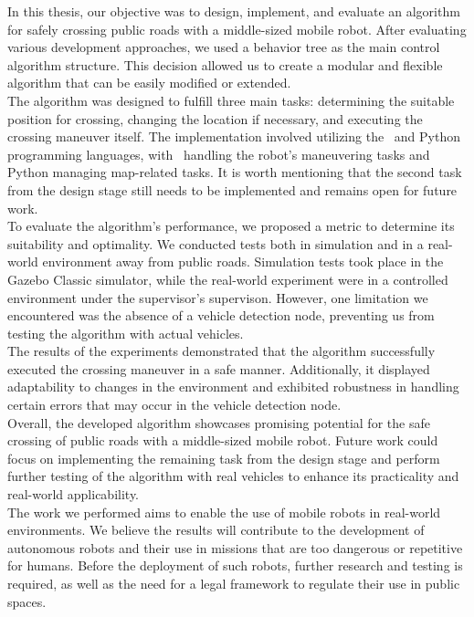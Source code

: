 In this thesis, our objective was to design, implement, and evaluate an algorithm for safely crossing public roads with a middle-sized mobile robot. After evaluating various development approaches, we used a behavior tree as the main control algorithm structure. This decision allowed us to create a modular and flexible algorithm that can be easily modified or extended.\\
The algorithm was designed to fulfill three main tasks: determining the suitable position for crossing, changing the location if necessary, and executing the crossing maneuver itself. The implementation involved utilizing the \CC\ and Python programming languages, with \CC\ handling the robot's maneuvering tasks and Python managing map-related tasks. It is worth mentioning that the second task from the design stage still needs to be implemented and remains open for future work.\\
To evaluate the algorithm's performance, we proposed a metric to determine its suitability and optimality. We conducted tests both in simulation and in a real-world environment away from public roads. Simulation tests took place in the Gazebo Classic simulator, while the real-world experiment were in a controlled environment under the supervisor's supervison. However, one limitation we encountered was the absence of a vehicle detection node, preventing us from testing the algorithm with actual vehicles.\\
The results of the experiments demonstrated that the algorithm successfully executed the crossing maneuver in a safe manner. Additionally, it displayed adaptability to changes in the environment and exhibited robustness in handling certain errors that may occur in the vehicle detection node.\\
Overall, the developed algorithm showcases promising potential for the safe crossing of public roads with a middle-sized mobile robot. Future work could focus on implementing the remaining task from the design stage and perform further testing of the algorithm with real vehicles to enhance its practicality and real-world applicability.\\
The work we performed aims to enable the use of mobile robots in real-world environments. We believe the results will contribute to the development of autonomous robots and their use in missions that are too dangerous or repetitive for humans. Before the deployment of such robots, further research and testing is required, as well as the need for a legal framework to regulate their use in public spaces.
